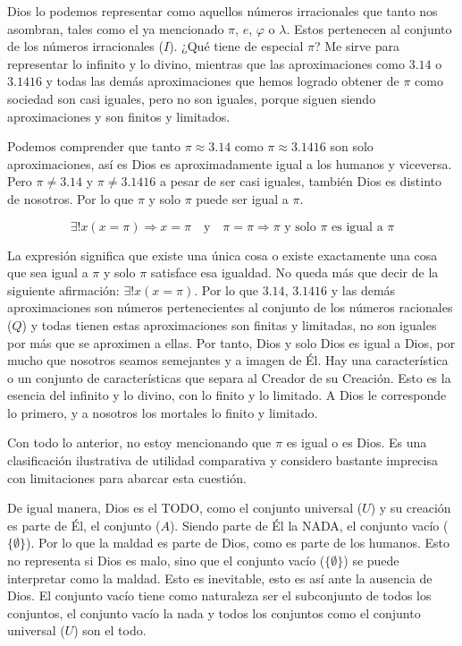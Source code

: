 \documentclass[letterpaper,12pt]{article}
\begin{document}
Dios lo podemos representar como aquellos números irracionales que tanto nos asombran, tales como el ya mencionado \(\pi\), \(e\), \(\varphi\) o \(\lambda\). Estos pertenecen al conjunto de los números irracionales (\(I\)). ¿Qué tiene de especial \(\pi\)? Me sirve para representar lo infinito y lo divino, mientras que las aproximaciones como \(3.14\) o \(3.1416\) y todas las demás aproximaciones que hemos logrado obtener de \(\pi\) como sociedad son casi iguales, pero no son iguales, porque siguen siendo aproximaciones y son finitos y limitados.

Podemos comprender que tanto \(\pi \approx 3.14\) como \(\pi \approx 3.1416\) son solo aproximaciones, así es Dios es aproximadamente igual a los humanos y viceversa. Pero \(\pi \neq 3.14\) y \(\pi \neq 3.1416\) a pesar de ser casi iguales, también Dios es distinto de nosotros. Por lo que \(\pi\) y solo \(\pi\) puede ser igual a \(\pi\).

\[
\exists! x (x = \pi) \Rightarrow x = \pi \quad \text{y} \quad \pi = \pi \Rightarrow \pi \text{ y solo } \pi \text{ es igual a } \pi
\]

La expresión significa que existe una única cosa o existe exactamente una cosa que sea igual a \(\pi\) y solo \(\pi\) satisface esa igualdad. No queda más que decir de la siguiente afirmación: \(\exists! x (x = \pi)\). Por lo que \(3.14\), \(3.1416\) y las demás aproximaciones son números pertenecientes al conjunto de los números racionales (\(Q\)) y todas tienen estas aproximaciones son finitas y limitadas, no son iguales por más que se aproximen a ellas. Por tanto, Dios y solo Dios es igual a Dios, por mucho que nosotros seamos semejantes y a imagen de Él. Hay una característica o un conjunto de características que separa al Creador de su Creación. Esto es la esencia del infinito y lo divino, con lo finito y lo limitado. A Dios le corresponde lo primero, y a nosotros los mortales lo finito y limitado.

Con todo lo anterior, no estoy mencionando que \(\pi\) es igual o es Dios. Es una clasificación ilustrativa de utilidad comparativa y considero bastante imprecisa con limitaciones para abarcar esta cuestión.

De igual manera, Dios es el TODO, como el conjunto universal (\(U\)) y su creación es parte de Él, el conjunto (\(A\)). Siendo parte de Él la NADA, el conjunto vacío (\(\{\emptyset\}\)). Por lo que la maldad es parte de Dios, como es parte de los humanos. Esto no representa si Dios es malo, sino que el conjunto vacío (\(\{\emptyset\}\)) se puede interpretar como la maldad. Esto es inevitable, esto es así ante la ausencia de Dios. El conjunto vacío tiene como naturaleza ser el subconjunto de todos los conjuntos, el conjunto vacío la nada y todos los conjuntos como el conjunto universal (\(U\)) son el todo.
\end{document}
